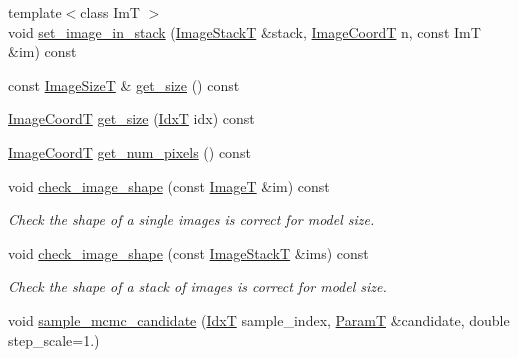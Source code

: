 \begin{DoxyCompactItemize}
\item 
{\footnotesize template$<$class ImT $>$ }\\void \hyperlink{classmappel_1_1ImageFormat2DBase_aaae78a9b02452eb3538af34fcdcc3ad2}{set\+\_\+image\+\_\+in\+\_\+stack} (\hyperlink{classmappel_1_1ImageFormat2DBase_a8f0276e94ff242fa4740a718642f5e14}{Image\+StackT} \&stack, \hyperlink{classmappel_1_1ImageFormat2DBase_a45e9234d63c357f34ca56c72c12b9e9c}{Image\+CoordT} n, const ImT \&im) const 
\item 
const \hyperlink{classmappel_1_1ImageFormat2DBase_a49cccf61eb2a768a202634d27fcd81d5}{Image\+SizeT} \& \hyperlink{classmappel_1_1ImageFormat2DBase_a4497fe096f82ccb3af3c3632921081a5}{get\+\_\+size} () const 
\item 
\hyperlink{classmappel_1_1ImageFormat2DBase_a45e9234d63c357f34ca56c72c12b9e9c}{Image\+CoordT} \hyperlink{classmappel_1_1ImageFormat2DBase_a07ad97af7e697240ee359ae6a4821a2f}{get\+\_\+size} (\hyperlink{namespacemappel_ab17ec0f30b61ece292439d7ece81d3a8}{IdxT} idx) const 
\item 
\hyperlink{classmappel_1_1ImageFormat2DBase_a45e9234d63c357f34ca56c72c12b9e9c}{Image\+CoordT} \hyperlink{classmappel_1_1ImageFormat2DBase_a4f9e0d332462ff53678c03700666a564}{get\+\_\+num\+\_\+pixels} () const 
\item 
void \hyperlink{classmappel_1_1ImageFormat2DBase_aa5f3936c1c0b250fa1df17d53161a991}{check\+\_\+image\+\_\+shape} (const \hyperlink{classmappel_1_1ImageFormat2DBase_a667ea5016648958e507e7db8eaa041b0}{ImageT} \&im) const 
\begin{DoxyCompactList}\small\item\em Check the shape of a single images is correct for model size. \end{DoxyCompactList}\item 
void \hyperlink{classmappel_1_1ImageFormat2DBase_ab40faca8bf94a6e59765da5c3185c19b}{check\+\_\+image\+\_\+shape} (const \hyperlink{classmappel_1_1ImageFormat2DBase_a8f0276e94ff242fa4740a718642f5e14}{Image\+StackT} \&ims) const 
\begin{DoxyCompactList}\small\item\em Check the shape of a stack of images is correct for model size. \end{DoxyCompactList}\item 
void \hyperlink{classmappel_1_1MCMCAdaptor2D_af758ccc07ef163fd94a835dc1a39dcd3}{sample\+\_\+mcmc\+\_\+candidate} (\hyperlink{namespacemappel_ab17ec0f30b61ece292439d7ece81d3a8}{IdxT} sample\+\_\+index, \hyperlink{classmappel_1_1PointEmitterModel_a665ec6aea3aac139bb69a23c06d4b9a1}{ParamT} \&candidate, double step\+\_\+scale=1.)

\end{DoxyCompactItemize}
